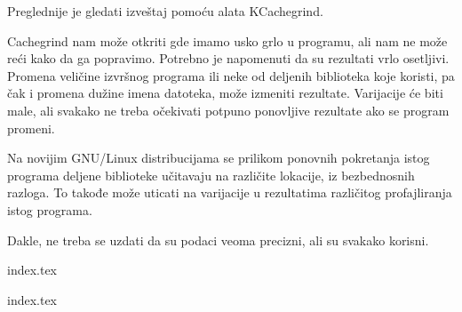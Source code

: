 Preglednije je gledati izveštaj pomoću alata KCachegrind.

Cachegrind nam može otkriti gde imamo usko grlo u programu, ali nam ne može reći kako da ga popravimo. Potrebno je napomenuti da su rezultati vrlo osetljivi. Promena veličine izvršnog programa ili neke od deljenih biblioteka koje koristi, pa čak i promena dužine imena datoteka, može izmeniti rezultate. Varijacije će biti male, ali svakako ne treba očekivati potpuno ponovljive rezultate ako se program promeni.

Na novijim GNU/Linux distribucijama se prilikom ponovnih pokretanja istog programa deljene biblioteke učitavaju na različite lokacije, iz bezbednosnih razloga. To takođe može uticati na varijacije u rezultatima različitog profajliranja istog programa.

Dakle, ne treba se uzdati da su podaci veoma precizni, ali su svakako korisni.

{index.tex}

{index.tex}
